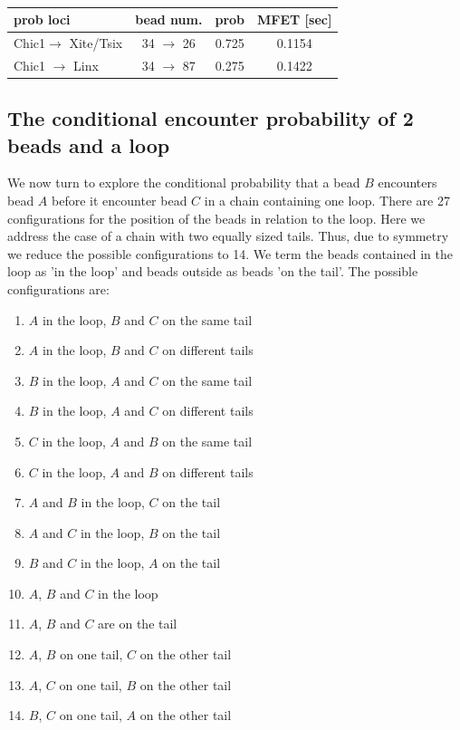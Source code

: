 \documentclass[12pt]{paper}
\begin{document}
\begin{table}[H]

\begin{tabular}{l | c| c| c|}
 prob loci & bead num. &prob & MFET [sec]\\
\hline
 Chic1$\rightarrow$ Xite/Tsix & 34 $\rightarrow$ 26   & 0.725 & 0.1154\\
 Chic1 $\rightarrow$ Linx     & 34 $\rightarrow$ 87  & 0.275 & 0.1422	
 \end{tabular}
 \caption{}\label{conditionalEncounterDynamicLoop}
\end{table}

\subsection{The conditional encounter probability of 2 beads and a loop}
We now turn to explore the conditional probability that a bead $B$ encounters bead $A$ before it encounter bead $C$ in a chain containing one loop. There are 27 configurations for the position of the beads in relation to the loop. Here we address the case of a chain with two equally sized tails. Thus, due to symmetry we reduce the possible configurations to 14. We term the beads contained in the loop as 'in the loop' and beads outside as beads 'on the tail'. The possible configurations are: 
\begin{enumerate}
\item $A$ in the loop, $B$ and $C$ on the same tail
\item $A$ in the loop, $B$ and $C$ on different tails
\item $B$ in the loop, $A$ and $C$ on the same tail
\item $B$ in the loop, $A$ and $C$ on different tails
\item $C$ in the loop, $A$ and $B$ on the same tail 
\item $C$ in the loop, $A$ and $B$ on different tails 
\item $A$ and $B$ in the loop, $C$ on the tail 
\item $A$ and $C$ in the loop, $B$ on the tail 
\item $B$ and $C$ in the loop, $A$ on the tail 
\item $A$, $B$ and $C$ in the loop
\item $A$, $B$ and $C$ are on the tail
\item $A$, $B$ on one tail, $C$ on the other tail
\item $A$, $C$ on one tail, $B$ on the other tail
\item $B$, $C$ on one tail, $A$ on the other tail
\end{enumerate}
\end{document}
